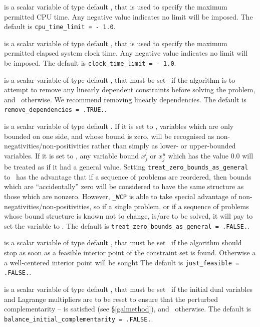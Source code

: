 \documentclass{galahad}
\newcommand{\packagename}{WCP}
\newcommand{\fullpackagename}{\libraryname\_\-\packagename}
\begin{document}
\begin{description}
 is a scalar variable of type default \realdp, 
that is used to specify the maximum permitted CPU time. Any negative
value indicates no limit will be imposed. The default is 
{\tt cpu\_time\_limit = - 1.0}.

 is a scalar variable of type default \realdp, 
that is used to specify the maximum permitted elapsed system clock time. 
Any negative value indicates no limit will be imposed. The default is 
{\tt clock\_time\_limit = - 1.0}.

 is a scalar variable of type 
default \logical, that must be set \true\ if the algorithm
is to attempt to remove any linearly dependent constraints before
solving the problem, and \false\ otherwise. 
We recommend removing linearly dependencies.
The default is {\tt remove\_dependencies = .TRUE.}.

 is a scalar variable of type 
default \logical.
If it is set to \false, variables which 
are only bounded on one side, and whose bound is zero,
will be recognised as non-negativities/non-positivities rather than simply as
lower- or upper-bounded variables.
If it is set to \true, any variable bound 
$x_{j}^{l}$ or $x_{j}^{u}$ which has the value 0.0 will be
treated as if it had a general value.
Setting {\tt treat\_zero\_bounds\_as\_general} to \true\ has the advantage
that if a sequence of problems are reordered, then bounds which are
``accidentally'' zero will be considered to have the same structure as
those which are nonzero. However, {\tt \fullpackagename} is
able to take special advantage of non-negativities/non-positivities, so
if a single problem, or if a sequence of problems whose 
bound structure is known not to change, is/are to be solved, 
it will pay to set the variable to \false.
The default is {\tt treat\_zero\_bounds\_as\_general = .FALSE.}.

 is a scalar variable of type default \logical, that 
must be set \true\ if the algorithm should stop as soon as a feasible 
interior point of the constraint set is found. Otherwise a a well-centered
interior point will be sought
The default is {\tt just\_feasible = .FALSE.}.

 is a scalar variable of type 
default \logical, that must be set \true\ if the initial dual variables
and Lagrange multipliers are to be reset to ensure that the
perturbed complementarity --
is satisfied (see \S\ref{galmethod}), and \false\ otherwise.
The default is {\tt balance\_initial\_complementarity = .FALSE.}.


\end{description}
\end{document}
